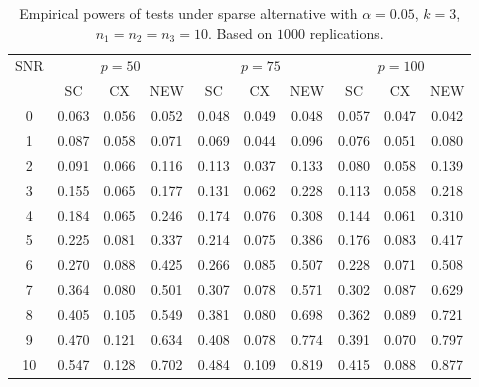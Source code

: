 \documentclass[review]{elsarticle}
\theoremstyle{plain}
\theoremstyle{definition}
\theoremstyle{remark}
\begin{document}
\begin{table}[!hbp]
    \caption{Empirical powers of tests under sparse alternative with $\alpha=0.05$, $k=3$, $n_1=n_2=n_3=10$. Based on $1000$ replications.}
\centering
\begin{tabular}{*{10}{c}}
\toprule
\multirow{2}{*}{SNR} &\multicolumn{3}{c}{$p=50$}&\multicolumn{3}{c}{$p=75$}&\multicolumn{3}{c}{$p=100$} \\
    \cmidrule(r){2-4}\cmidrule(r){5-7}\cmidrule(r){8-10}
    &SC & CX & NEW& SC & CX & NEW &SC & CX & NEW\\
\midrule
0 & 0.063 & 0.056 & 0.052 & 0.048 & 0.049 & 0.048 & 0.057 & 0.047 & 0.042 \\ 
1 & 0.087 & 0.058 & 0.071 & 0.069 & 0.044 & 0.096 & 0.076 & 0.051 & 0.080 \\ 
2 & 0.091 & 0.066 & 0.116 & 0.113 & 0.037 & 0.133 & 0.080 & 0.058 & 0.139 \\ 
3 & 0.155 & 0.065 & 0.177 & 0.131 & 0.062 & 0.228 & 0.113 & 0.058 & 0.218 \\ 
4 & 0.184 & 0.065 & 0.246 & 0.174 & 0.076 & 0.308 & 0.144 & 0.061 & 0.310 \\ 
5 & 0.225 & 0.081 & 0.337 & 0.214 & 0.075 & 0.386 & 0.176 & 0.083 & 0.417 \\ 
6 & 0.270 & 0.088 & 0.425 & 0.266 & 0.085 & 0.507 & 0.228 & 0.071 & 0.508 \\ 
7 & 0.364 & 0.080 & 0.501 & 0.307 & 0.078 & 0.571 & 0.302 & 0.087 & 0.629 \\ 
8 & 0.405 & 0.105 & 0.549 & 0.381 & 0.080 & 0.698 & 0.362 & 0.089 & 0.721 \\ 
9 & 0.470 & 0.121 & 0.634 & 0.408 & 0.078 & 0.774 & 0.391 & 0.070 & 0.797 \\ 
10 & 0.547 & 0.128 & 0.702 & 0.484 & 0.109 & 0.819 & 0.415 & 0.088 & 0.877 \\ 
\bottomrule
\end{tabular}
\end{table}
\end{document}

